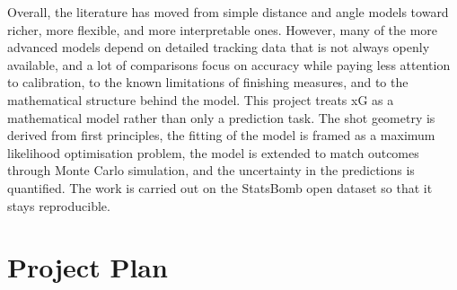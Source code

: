 \documentclass[11pt]{article}
\begin{document}
Overall, the literature has moved from simple distance and angle models toward
richer, more flexible, and more interpretable ones. However, many of the more
advanced models depend on detailed tracking data that is not always openly
available, and a lot of comparisons focus on accuracy while paying less
attention to calibration, to the known limitations of finishing measures, and to
the mathematical structure behind the model. This project treats xG as a
mathematical model rather than only a prediction task. The shot geometry is
derived from first principles, the fitting of the model is framed as a maximum
likelihood optimisation problem, the model is extended to match outcomes through
Monte Carlo simulation, and the uncertainty in the predictions is quantified.
The work is carried out on the StatsBomb open dataset so that it stays
reproducible.

\section*{Project Plan}
\end{document}
